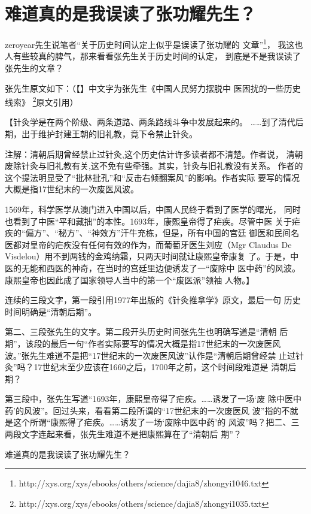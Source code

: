 \chapter{难道真的是我误读了张功耀先生？}

zeroyear先生说笔者“关于历史时间认定上似乎是误读了张功耀的
文章”\footnote{http://xys.org/xys/ebooks/others/science/dajia8/zhongyi1046.txt}，
我这也人有些较真的脾气，那来看看张先生关于历史时间的认定，
到底是不是我误读了张先生的文章？

张先生原文如下：（【】中文字为张先生《中国人民努力摆脱中
医困扰的一些历史线索》
\footnote{http://xys.org/xys/ebooks/others/science/dajia8/zhongyi1035.txt}原文引用）

【\fangsong 针灸学是在两个阶级、两条道路、两条路线斗争中发展起来的。
……到了清代后期，出于维护封建王朝的旧礼教，竟下令禁止针灸。

注解：清朝后期曾经禁止过针灸,这个历史估计许多读者都不清楚。作者说，
清朝废除针灸与旧礼教有关,这不免有些牵强。其实，针灸与旧礼教没有关系。
作者的这个提法明显受了“批林批孔”和“反击右倾翻案风”的影响。作者实际
要写的情况大概是指17世纪末的一次废医风波。

1569年，科学医学从澳门进入中国以后，中国人民终于看到了医学的曙光，
同时也看到了中医“平和藏拙”的本性。1693年，康熙皇帝得了疟疾。尽管中医
关于疟疾的“偏方”、“秘方”、“神效方”汗牛充栋，但是，所有中国的宫廷
御医和民间名医都对皇帝的疟疾没有任何有效的作为，而葡萄牙医生刘应（Mgr
Claudus De Visdelou）用不到两钱的金鸡纳霜，只两天时间就让康熙皇帝康复
了。于是，中医的无能和西医的神奇，在当时的宫廷里边便诱发了一“废除中
医中药”的风波。康熙皇帝也因此成了国家领导人当中的第一个“废医派”领袖
人物。\normalfont 】

连续的三段文字，第一段引用1977年出版的《针灸推拿学》原文，最后一句
历史时间明确是“清朝后期”。

第二、三段张先生的文字。第二段开头历史时间张先生也明确写道是“清朝
后期”，该段的最后一句“作者实际要写的情况大概是指17世纪末的一次废医风
波。”张先生难道不是把“17世纪末的一次废医风波”认作是“清朝后期曾经禁
止过针灸”吗？17世纪末至少应该在1660之后，1700年之前，这个时间段难道是
清朝后期？

第三段中，张先生写道“1693年，康熙皇帝得了疟疾。……诱发了一场‘废
除中医中药’的风波”。回过头来，看看第二段所谓的“17世纪末的一次废医风
波”指的不就是这个所谓“康熙得了疟疾。……诱发了一场‘废除中医中药’的
风波”吗？把二、三两段文字连起来看，张先生难道不是把康熙算在了“清朝后
期”？

难道真的是我误读了张功耀先生？
